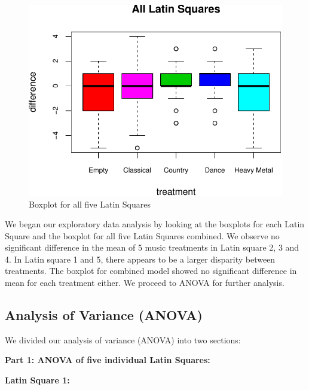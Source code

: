 \documentclass[]{article}
\begin{document}
\begin{figure}
\centering
\includegraphics{STATS101B-Project-Code_files/figure-latex/unnamed-chunk-5-1.pdf}
\caption{Boxplot for all five Latin Squares}
\end{figure}

We began our exploratory data analysis by looking at the boxplots for
each Latin Square and the boxplot for all five Latin Squares combined.
We observe no significant difference in the mean of 5 music treatments
in Latin square 2, 3 and 4. In Latin square 1 and 5, there appears to be
a larger disparity between treatments. The boxplot for combined model
showed no significant difference in mean for each treatment either. We
proceed to ANOVA for further analysis.

\subsection{Analysis of Variance
(ANOVA)}\label{analysis-of-variance-anova}

We divided our analysis of variance (ANOVA) into two sections:

\textbf{Part 1: ANOVA of five individual Latin Squares:}

\textbf{Latin Square 1:}
\end{document}

